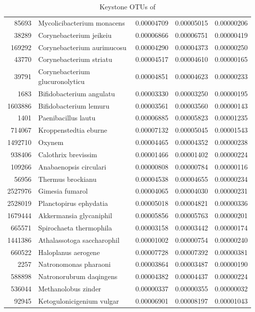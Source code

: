 \begin{table}[ht]
\begin{tabular}{rlrrr}
  85693 & Mycolicibacterium monacens & 0.00004709 & 0.00005015 & 0.00000206 \\ 
  38289 & Corynebacterium jeikeiu & 0.00006866 & 0.00006751 & 0.00000419 \\ 
  169292 & Corynebacterium aurimucosu & 0.00004290 & 0.00004373 & 0.00000250 \\ 
  43770 & Corynebacterium striatu & 0.00004517 & 0.00004610 & 0.00000165 \\ 
  39791 & Corynebacterium glucuronolyticu & 0.00004851 & 0.00004623 & 0.00000233 \\ 
  1683 & Bifidobacterium angulatu & 0.00003330 & 0.00003250 & 0.00000195 \\ 
  1603886 & Bifidobacterium lemuru & 0.00003561 & 0.00003560 & 0.00000143 \\ 
  1401 & Paenibacillus lautu & 0.00006885 & 0.00005823 & 0.00001235 \\ 
  714067 & Kroppenstedtia eburne & 0.00007132 & 0.00005045 & 0.00001543 \\ 
  1492710 & Oxynem & 0.00004465 & 0.00004352 & 0.00000238 \\ 
  938406 & Calothrix brevissim & 0.00001466 & 0.00001402 & 0.00000224 \\ 
  109266 & Anabaenopsis circulari & 0.00000808 & 0.00000784 & 0.00000116 \\ 
  56956 & Thermus brockianu & 0.00004538 & 0.00004655 & 0.00000234 \\ 
  2527976 & Gimesia fumarol & 0.00004065 & 0.00004030 & 0.00000231 \\ 
  2528019 & Planctopirus ephydatia & 0.00005018 & 0.00004821 & 0.00000336 \\ 
  1679444 & Akkermansia glycaniphil & 0.00005856 & 0.00005763 & 0.00000201 \\ 
  665571 & Spirochaeta thermophila & 0.00003158 & 0.00003442 & 0.00000174 \\ 
  1441386 & Athalassotoga saccharophil & 0.00001002 & 0.00000754 & 0.00000240 \\ 
  660522 & Haloplanus aerogene & 0.00007728 & 0.00007392 & 0.00000381 \\ 
  2257 & Natronomonas pharaoni & 0.00003864 & 0.00003487 & 0.00000190 \\ 
  588898 & Natronorubrum daqingens & 0.00004382 & 0.00004437 & 0.00000224 \\ 
  536044 & Methanolobus zinder & 0.00000337 & 0.00000355 & 0.00000032 \\ 
  92945 & Ketogulonicigenium vulgar & 0.00006901 & 0.00008197 & 0.00001043 \\ 
   \hline
\end{tabular}
\caption{Keystone OTUs of } 
\end{table}
